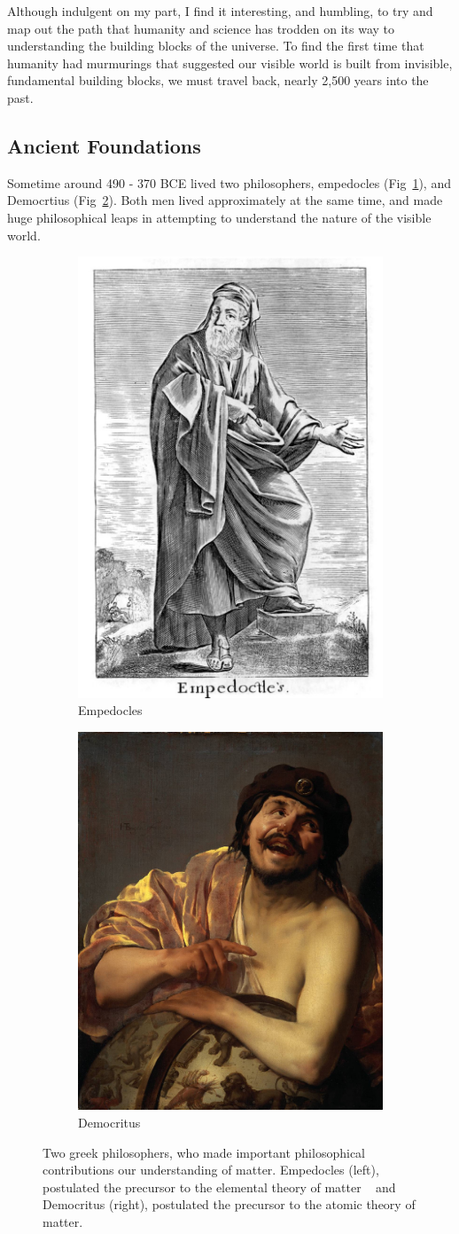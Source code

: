 Although indulgent on my part, I find it interesting, and humbling, to try and
map out the path that humanity and science has trodden on its way to
understanding the building blocks of the universe. To find the first time that
humanity had murmurings that suggested our visible world is built from
invisible, fundamental building blocks, we must travel back, nearly 2,500 years
into the past.

\subsection{Ancient Foundations}
Sometime around 490 - 370 BCE lived two philosophers, empedocles
(Fig~\ref{fig:empedocles}), and Democrtius (Fig~\ref{fig:democritus}). Both men
lived approximately at the same time, and made huge philosophical leaps in
attempting to understand the nature of the visible world.

\begin{figure}[ht]
	\centering
	\begin{subfigure}{.5\textwidth}
		\centering
		\includegraphics[width=0.4\linewidth]{../Chapter2/fig/empedocles.jpg}
		\caption{Empedocles}
		\label{fig:empedocles}
	\end{subfigure}%
	\begin{subfigure}{0.5\textwidth}
		\centering
		\includegraphics[width=0.4\linewidth]{../Chapter2/fig/democritus.jpg}
		\caption{Democritus}
		\label{fig:democritus}
	\end{subfigure}
	\caption{ Two greek philosophers, who made important philosophical
		contributions our understanding of matter. Empedocles (left), postulated the
		precursor to the elemental theory of matter ~\needcite{} and Democritus
		(right), postulated the precursor to the atomic theory of matter.  }
	\label{fig:atomists}
\end{figure}

